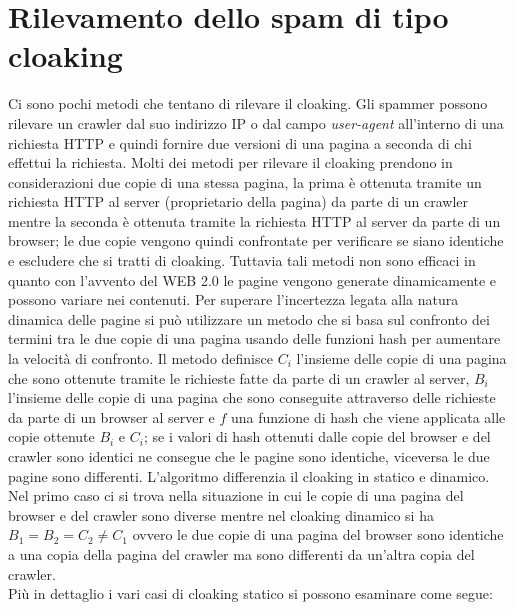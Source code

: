 \section{Rilevamento dello spam di tipo cloaking}
Ci sono pochi metodi che tentano di rilevare il cloaking. Gli spammer possono rilevare un crawler dal suo indirizzo IP o dal campo \textit{user-agent} all'interno di una richiesta HTTP e quindi fornire due versioni di una pagina a seconda di chi effettui la richiesta. Molti dei metodi per rilevare il cloaking prendono in considerazioni due copie di una stessa pagina, la prima è ottenuta tramite un richiesta HTTP al server (proprietario della pagina) da parte di un crawler mentre la seconda è ottenuta tramite la richiesta HTTP al server da parte di un browser; le due copie vengono quindi confrontate per verificare se siano identiche e escludere che si tratti di cloaking. Tuttavia tali metodi non sono efficaci in quanto con l'avvento del WEB 2.0 le pagine vengono generate dinamicamente e possono variare nei contenuti. Per superare l'incertezza legata alla natura dinamica delle pagine si può utilizzare un metodo \cite{Ghiam:2013cloaking} che si basa sul confronto dei termini tra le due copie di una pagina 
usando delle funzioni hash per aumentare la velocità di confronto. Il metodo definisce  \(C_i\) l'insieme delle copie di una pagina che sono ottenute tramite le richieste fatte da parte di un crawler al server, \(B_i\) l'insieme delle copie di una pagina che sono conseguite attraverso delle richieste da parte di un browser al server e \(f\) una funzione di hash che viene applicata alle copie ottenute \(B_i\) e \(C_i\); se i valori di hash ottenuti dalle copie del browser e del crawler  sono identici  ne consegue che  le pagine sono identiche, viceversa le due pagine sono differenti. L'algoritmo differenzia il cloaking in statico e dinamico. Nel primo caso ci si trova nella situazione in cui le copie di una pagina del browser e del crawler sono diverse mentre nel cloaking dinamico si ha \(B_1=B_2=C_2 \not =C_1\) ovvero le due copie di una pagina del browser sono identiche a una copia della pagina del crawler ma sono differenti da un'altra copia del crawler. \\
Più in dettaglio i vari casi di cloaking statico si possono esaminare come segue:
